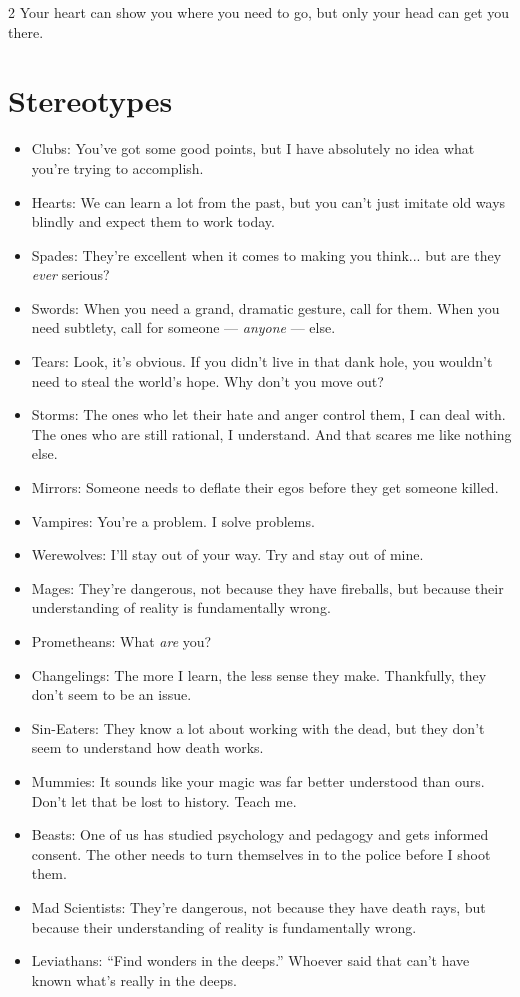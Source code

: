 \begin{multicols}{2}
Your heart can show you where you need to go, but only your head can get you there. 

\section*{Stereotypes}

\begin{itemize}
\item Clubs: You've got some good points, but I have absolutely no idea what you're trying to accomplish.
\item Hearts: We can learn a lot from the past, but you can't just imitate old ways blindly and expect them to work today.
\item Spades: They're excellent when it comes to making you think... but are they \textit{ever} serious?
\item Swords: When you need a grand, dramatic gesture, call for them. When you need subtlety, call for someone — \textit{anyone} — else.
\item Tears: Look, it's obvious. If you didn't live in that dank hole, you wouldn't need to steal the world's hope. Why don't you move out?
\item Storms: The ones who let their hate and anger control them, I can deal with. The ones who are still rational, I understand. And that scares me like nothing else.
\item Mirrors: Someone needs to deflate their egos before they get someone killed.

\item Vampires: You're a problem. I solve problems.
\item Werewolves: I'll stay out of your way. Try and stay out of mine.
\item Mages: They're dangerous, not because they have fireballs, but because their understanding of reality is fundamentally wrong.
\item Prometheans: What \textit{are} you?
\item Changelings: The more I learn, the less sense they make. Thankfully, they don't seem to be an issue.
\item Sin-Eaters: They know a lot about working with the dead, but they don't seem to understand how death works.
\item Mummies: It sounds like your magic was far better understood than ours. Don't let that be lost to history. Teach me. 
\item Beasts: One of us has studied psychology and pedagogy and gets informed consent. The other needs to turn themselves in to the police before I shoot them.
\item Mad Scientists: They're dangerous, not because they have death rays, but because their understanding of reality is fundamentally wrong.
\item Leviathans: “Find wonders in the deeps.” Whoever said that can't have known what's really in the deeps.


\end{itemize}
\end{multicols}
